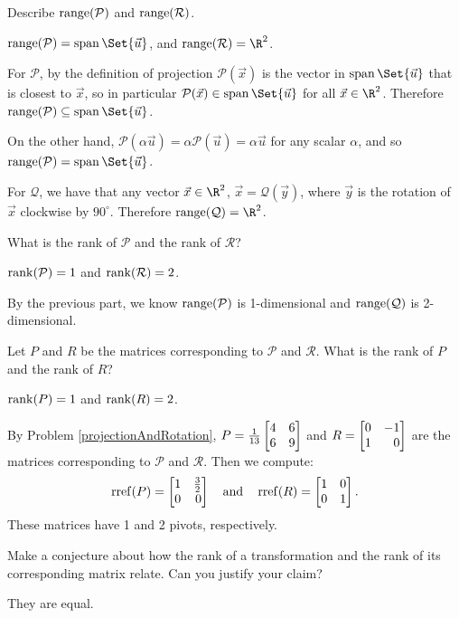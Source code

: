 	\begin{parts}
		\item Describe $\operatorname{range}(\mathcal P)$ and $\operatorname{range}(\mathcal R)$.
			\begin{solution}
				$\Range(\mathcal P)=\Span\Set{\vec u}$, and $\Range(\mathcal R)=\R^2$.

				For $\mathcal P$, by the definition of projection $\mathcal P(\vec x)$
				is the vector in $\Span\Set{\vec u}$ that is closest to $\vec x$,
				so in particular $\mathcal P(\vec x) \in \Span\Set{\vec u}$ for
				all $\vec x\in\R^2$. Therefore $\Range(\mathcal P)\subseteq\Span\Set{\vec u}$.

				On the other hand, $\mathcal P(\alpha \vec u)=\alpha\mathcal P(\vec u)=\alpha\vec u$
				for any scalar $\alpha$, and so $\Range(\mathcal P)=\Span\Set{\vec u}$.

				For $\mathcal Q$, we have that any vector $\vec x\in\R^2$,
				$\vec x=\mathcal Q(\vec y)$, where $\vec y$ is the rotation of
				$\vec x$ clockwise by $90^\circ$. Therefore $\Range(\mathcal Q)=\R^2$.
			\end{solution}
		\item What is the rank of $\mathcal P$ and the rank of $\mathcal R$?
			\begin{solution}
				$\operatorname{rank}(\mathcal P)=1$ and $\operatorname{rank}(\mathcal R)=2$.

				By the previous part, we know $\operatorname{range}(\mathcal P)$ is 1-dimensional
				and $\operatorname{range}(\mathcal Q)$ is 2-dimensional.
			\end{solution}
		\item Let $P$ and $R$ be the matrices corresponding to $\mathcal P$ and
			$\mathcal R$. What is the rank of $P$ and the rank of $R$?
			\begin{solution}
				$\operatorname{rank}(P)=1$ and $\operatorname{rank}(R)=2$.

				By Problem \ref{projectionAndRotation}, $P=\frac{1}{13}\mat{4&6\\6&9}$
				and $R=\mat{0&-1\\1&0}$ are the	matrices corresponding to
				$\mathcal P$ and $\mathcal R$. Then we compute:
				\[
					\rref(P)=\mat{1&\frac{3}{2}\\0&0}
					\quad \text{and} \quad
					\rref(R)=\mat{1&0\\0&1}.
				\]
				These matrices have 1 and 2 pivots, respectively.
			\end{solution}
		\item Make a conjecture about how the rank of a transformation and the
			rank of its corresponding matrix relate. Can you justify your claim?
			\label{rankOfMatricesAndTransformations.4}
			\begin{solution}
				They are equal.


\end{solution}
\end{parts}
